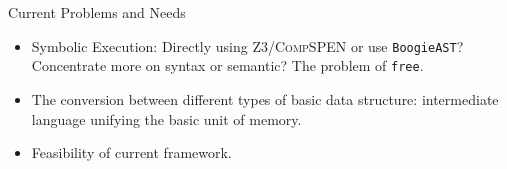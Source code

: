\documentclass[aspectratio=1610, 13pt]{beamer}
\begin{document}
\begin{frame}{Current Problems and Needs}
\begin{itemize}
    \item Symbolic Execution: Directly using \textsc{Z3}/\textsc{CompSPEN} or use \texttt{BoogieAST}? Concentrate more on syntax or semantic? The problem of \texttt{free}.
    \item The conversion between different types of basic data structure: intermediate language unifying the basic unit of memory.
    \item Feasibility of current framework.
\end{itemize}
\end{frame}
\end{document}
